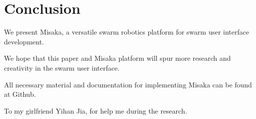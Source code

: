 \documentclass[sigconf]{acmart}
\begin{document}
\section{Conclusion}

We present Misaka, a versatile swarm robotics platform for swarm user interface development.

We hope that this paper and Misaka platform will spur more research and creativity in the swarm user interface.

All necessary material and documentation for implementing Misaka can be found at Github.

\begin{acks}
To my girlfriend Yihan Jia, for help me during the research.
\end{acks}




\end{document}
